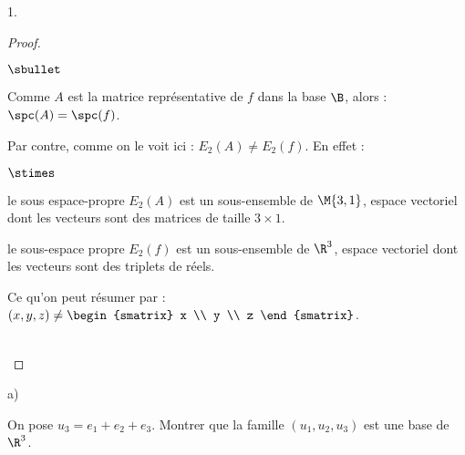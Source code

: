 \documentclass[11pt]{article}%
\begin{document}
\begin{noliste}{1.}
\begin{proof}
    \begin{remark}%
      \begin{noliste}{$\sbullet$}
      \item Comme $A$ est la matrice représentative de $f$ dans la
        base $\B$, alors : $\spc(A) = \spc(f)$.
      \item Par contre, comme on le voit ici : $E_2(A) \neq
        E_2(f)$. En effet :
        \begin{noliste}{$\stimes$}
        \item le sous espace-propre $E_2(A)$ est un sous-ensemble de
          $\M{3,1}$, espace vectoriel dont les vecteurs sont des
          matrices de taille $3 \times 1$.
        \item le sous-espace propre $E_2(f)$ est un sous-ensemble de
          $\R^3$, espace vectoriel dont les vecteurs sont des triplets
          de réels.
        \end{noliste}
        Ce qu'on peut résumer par : $(x, y, z) \neq
        \begin{smatrix}
          x \\
          y \\
          z
        \end{smatrix}
        $.
      \end{noliste}
    \end{remark}~\\[-1.4cm]
  \end{proof}

\item 
  \begin{noliste}{a)}
    \setlength{\itemsep}{2mm}
  \item On pose $u_{3} = e_{1} + e_{2} + e_{3}$. Montrer que la
    famille $(u_{1},u_{2},u_{3})$ est une base de $\R^{3}$.


\end{noliste}
\end{noliste}
\end{document}
